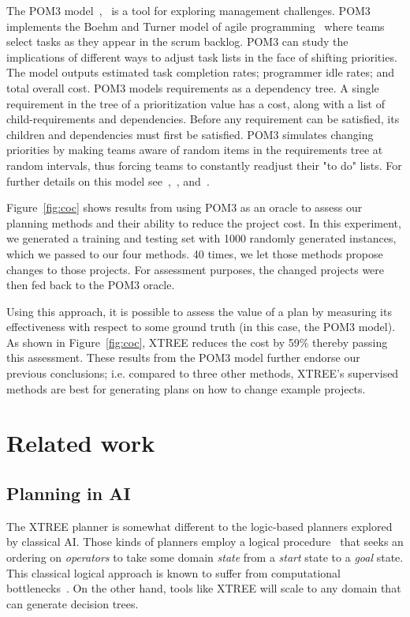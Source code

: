 \documentclass{sig-alternate}
\newcommand{\fig}[1]{Figure~\ref{fig:#1}}
\begin{document}
The POM3 model~\cite{boehm2003using},~\cite{port2008} is a tool for exploring management challenges. POM3 implements the Boehm and Turner model of agile programming~\cite{boehm2003balancing} where teams select tasks as they appear in the scrum backlog.  POM3 can study the implications of different ways to adjust task lists in the face of shifting priorities. The model outputs estimated task completion rates; programmer idle rates; and total overall cost. POM3 models requirements as a dependency tree. A single requirement in the tree of a prioritization value has a cost, along with a list of child-requirements and dependencies. Before any requirement can be satisfied, its children and dependencies must first be satisfied. POM3 simulates changing priorities by making teams aware of random items in the requirements tree at random intervals, thus forcing teams to constantly readjust their "to do" lists. For further details on this model see~\cite{boehm2003using},~\cite{port2008}, and~\cite{boehm2003balancing}. 

\fig{coc} shows results from using POM3 as an oracle to assess our planning methods and their ability to reduce the project cost. In this experiment, we generated a training and testing set with 1000 randomly generated instances, which we passed to our four methods.
40 times, we let those methods propose changes to those projects. 
For assessment purposes, the changed projects were then fed back to the POM3
oracle. 

Using this approach, it is possible to assess the value of a plan by measuring its
effectiveness with respect to some ground truth (in this case, the POM3 model).
As shown in \fig{coc}, XTREE reduces the cost by 59\% thereby passing this assessment. These results from the POM3 model further endorse our previous conclusions; i.e. compared to three other methods,  XTREE's supervised methods are best for generating plans on how to change example projects.
 
 
\section{Related work}

\subsection{Planning in AI}

The XTREE planner is somewhat different to the logic-based planners explored by 
classical AI. 
Those kinds of planners employ a logical procedure~\cite{Fikes1971}
that seeks an ordering on {\em operators} to take some domain
{\em state} from a {\em start} state to a {\em  goal} state.
This classical logical approach is known to suffer from
computational bottlenecks~\cite{Bylander1994}. On the other hand, tools like XTREE will scale to any domain
that can generate decision trees.
  
\end{document}
